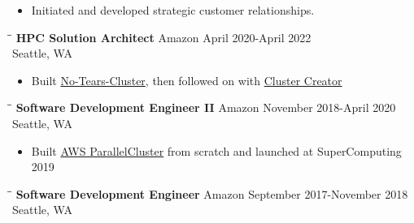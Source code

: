 \documentclass{res}
\begin{document}
\begin{resume}
\begin{itemize}
\item Initiated and developed strategic customer relationships.
    \end{itemize}
\vspace{-0.10in}
 \begin{tabbing}
   \hspace{2.5in}\= \hspace{2.6in}\= \kill %
    {\bf HPC Solution Architect} \>Amazon     \>April 2020-April 2022\\
                             \>Seattle, WA
   \end{tabbing}\vspace{-10pt}      %
   \begin{itemize}
   \setlength\itemsep{0em}
\item Built \href{https://github.com/aws-samples/no-tears-cluster}{No-Tears-Cluster}, then followed on with \href{https://cluster-creator.swsmith.cc/}{Cluster Creator}
    \end{itemize}
\vspace{-0.10in}
 \begin{tabbing}
   \hspace{2.5in}\= \hspace{2.6in}\= \kill %
    {\bf Software Development Engineer II} \>Amazon     \>November 2018-April 2020\\
                             \>Seattle, WA
   \end{tabbing}\vspace{-10pt}      %
   \begin{itemize}
   \setlength\itemsep{0em}
\item Built \href{https://github.com/aws/aws-parallelcluster}{AWS ParallelCluster} from scratch and launched at SuperComputing 2019
    \end{itemize}
\vspace{-0.10in}
 \begin{tabbing}
   \hspace{2.5in}\= \hspace{2.6in}\= \kill %
    {\bf Software Development Engineer} \>Amazon     \>September 2017-November 2018\\
                             \>Seattle, WA
   \end{tabbing}\vspace{-10pt}      %

\end{resume}
\end{document}
